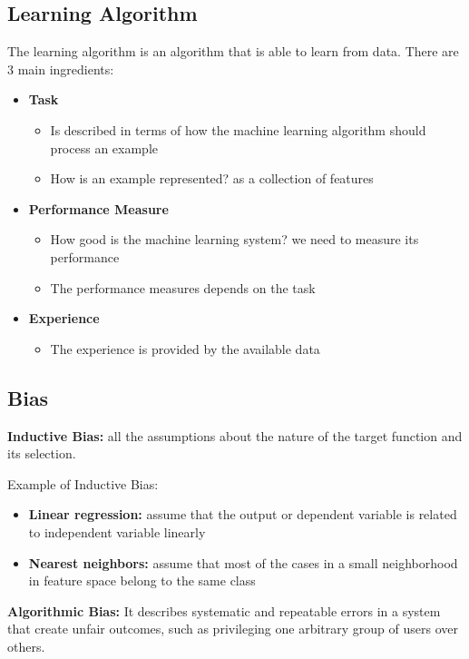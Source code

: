 \subsection{Learning Algorithm}
The learning algorithm is an algorithm that is able to learn from data. There are 3 main ingredients:
\begin{itemize}
    \item \textbf{Task}
    \begin{itemize}
        \item Is described in terms of how the machine learning algorithm should process an example
        \item How is an example represented? as a collection of features
    \end{itemize}
    \item \textbf{Performance Measure}
    \begin{itemize}
        \item How good is the machine learning system? we need to measure its performance
        \item The performance measures depends on the task
    \end{itemize}
    \item \textbf{Experience}
    \begin{itemize}
        \item The experience is provided by the available data
    \end{itemize}
\end{itemize}

\subsection{Bias}
\begin{mdframed}
    \textbf{Inductive Bias:} all the assumptions about the nature of the target function and its selection.
\end{mdframed}
Example of Inductive Bias:
\begin{itemize}
    \item \textbf{Linear regression:} assume that the output or dependent variable is related to independent variable linearly
    \item \textbf{Nearest neighbors:} assume that most of the cases in a small neighborhood in feature space belong to the same class
\end{itemize}
\begin{mdframed}
    \textbf{Algorithmic Bias:} It describes systematic and repeatable errors in a system that create unfair outcomes, such as privileging one arbitrary group of users over others.
\end{mdframed}
